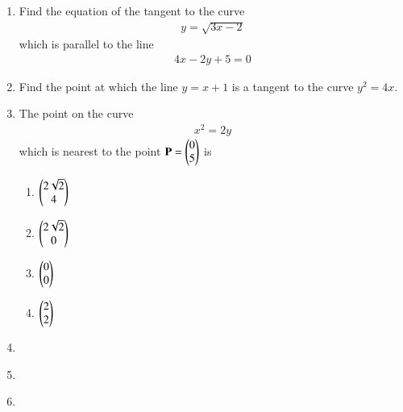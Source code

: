 \begin{enumerate}[label=\thesubsection.\arabic*,ref=\thesubsection.\theenumi]
\label{chapters/12/6/3/19}
\\
\solution

\item 
Find the equation of the tangent to the curve 
\begin{align}
	y = \sqrt{3x-2}
\end{align}
which is parallel to the line
\begin{align}
	4x-2y+5 = 0
\end{align}
\solution 
\label{chapters/12/6/3/25}

\item 
Find the point at which the line $y = x + 1$ is a tangent to the curve $y^2 = 4x$.
\\
\solution 
\label{chapters/12/6/3/27}

    \item The point on the curve 
\label{chapters/12/6/5/27}
    \begin{align}
        x^2 = 2y
        \label{eq:chapters/12/6/5/27/curve}
    \end{align}
    which is nearest to the point 
    $\mathbf{P} = \begin{pmatrix}0\\5\end{pmatrix}$ is
    \begin{enumerate}
        \item $\begin{pmatrix}2\sqrt{2}\\4\end{pmatrix}$
        \item $\begin{pmatrix}2\sqrt{2}\\0\end{pmatrix}$
        \item $\begin{pmatrix}0\\0\end{pmatrix}$
        \item $\begin{pmatrix}2\\2\end{pmatrix}$
    \end{enumerate}
    \solution 

\item 
\label{chapters/12/6/6/4}
%
\item 
\label{chapters/12/6/6/21}
%
\item 
\label{chapters/12/6/6/22}
%
\end{enumerate}
